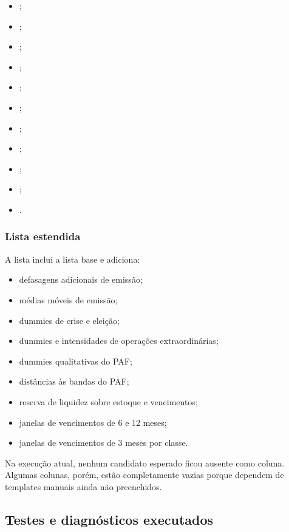 \documentclass[12pt,a4paper]{article}
\begin{document}
\begin{itemize}[leftmargin=1.2cm]
    \item {};
    \item {};
    \item {};
    \item {};
    \item {};
    \item {};
    \item {};
    \item {};
    \item {};
    \item {};
    \item {}.
\end{itemize}

\subsubsection{Lista estendida}

A lista  inclui a lista base e adiciona:

\begin{itemize}[leftmargin=1.2cm]
    \item defasagens adicionais de emissão;
    \item médias móveis de emissão;
    \item dummies de crise e eleição;
    \item dummies e intensidades de operações extraordinárias;
    \item dummies qualitativas do PAF;
    \item distâncias às bandas do PAF;
    \item reserva de liquidez sobre estoque e vencimentos;
    \item janelas de vencimentos de 6 e 12 meses;
    \item janelas de vencimentos de 3 meses por classe.
\end{itemize}

Na execução atual, nenhum candidato esperado ficou ausente como coluna. Algumas
colunas, porém, estão completamente vazias porque dependem de templates manuais
ainda não preenchidos.

\subsection{Testes e diagnósticos executados}
\end{document}
